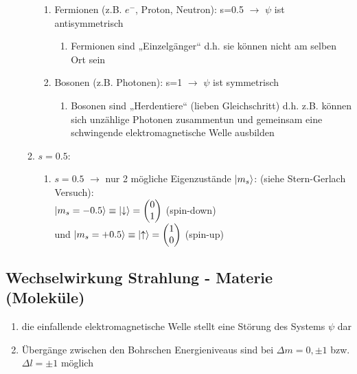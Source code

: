 \begin{enumerate}
\begin{enumerate}
\begin{enumerate}
    \item Fermionen (z.B. $e^-$, Proton, Neutron): s=0.5  $\rightarrow$ $\psi$ ist antisymmetrisch
    \begin{enumerate}
        \item Fermionen sind „Einzelgänger“ d.h. sie können nicht am selben Ort sein
    \end{enumerate}
    \item Bosonen (z.B. Photonen): s=1 $\rightarrow$ $\psi$ ist symmetrisch 
    \begin{enumerate}
        \item Bosonen sind „Herdentiere“ (lieben Gleichschritt) d.h. z.B.  können sich unzählige
        Photonen zusammentun und gemeinsam eine schwingende elektromagnetische Welle ausbilden 
    \end{enumerate}
\end{enumerate}
\item $s=0.5$:
\begin{enumerate}
    \item $s=0.5$ $\rightarrow$ nur 2 mögliche Eigenzustände $\ket{m_s}$: (siehe Stern-Gerlach Versuch):\\
    $\ket{m_s=-0.5}\equiv\ket{\downarrow}=\begin{pmatrix} 0\\ 1 \end{pmatrix}$  (spin-down) \\
    und $\ket{m_s=+0.5}\equiv\ket{\uparrow}=\begin{pmatrix} 1\\ 0\end{pmatrix}$ (spin-up)
\end{enumerate}
\end{enumerate}
\end{enumerate}

\subsection{Wechselwirkung Strahlung - Materie (Moleküle)}
\begin{enumerate}
    \item die einfallende elektromagnetische Welle stellt eine Störung des Systems $\psi$ dar
    \item Übergänge zwischen den Bohrschen Energieniveaus sind bei $\Delta m=0,\pm 1$ bzw. $\Delta l=\pm 1$ möglich
\end{enumerate}

\newpage